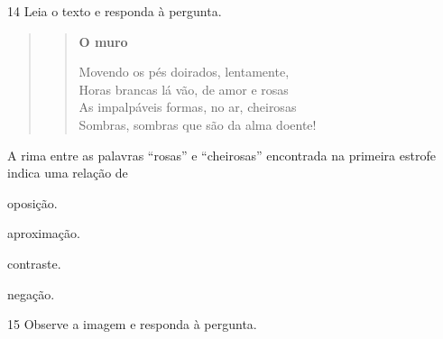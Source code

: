 \num{14} Leia o texto e responda à pergunta.

\begin{quote}
\begin{verse}
\textbf{O muro}

Movendo os pés doirados, lentamente,\\
Horas brancas lá vão, de amor e rosas\\
As impalpáveis formas, no ar, cheirosas\\
Sombras, sombras que são da alma doente!
\end{verse}

\end{quote}

A rima entre as palavras ``rosas'' e ``cheirosas'' encontrada na primeira
estrofe indica uma relação de

\begin{escolha}
  \item oposição.

  \item aproximação.

  \item contraste.

  \item negação.
\end{escolha}

\num{15} Observe a imagem e responda à pergunta.

